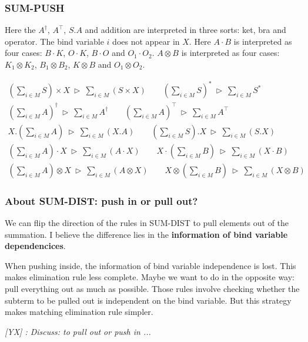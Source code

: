 \documentclass[manuscript, review, timestamp]{acmart}
\newcommand{\yx}[1]{\textit{\color{blue}[YX] : #1}}
\newcommand*{\reduce}{\ \triangleright\ }
\begin{document}
\subsubsection*{\textsf{SUM-PUSH}}

Here the $A^\dagger$, $A^\top$, $S.A$ and addition are interpreted in three sorts: ket, bra and operator.
The bind variable $i$ does not appear in $X$.
Here $A \cdot B$ is interpreted as four cases: $B \cdot K$, $O \cdot K$, $B \cdot O$ and $O_1 \cdot O_2$. $A \otimes B$ is interpreted as four cases: $K_1 \otimes K_2$, $B_1 \otimes B_2$, $K \otimes B$ and $O_1 \otimes O_2$.

\begin{gather*}
  (\sum_{i \in M} S) \times X \reduce \sum_{i \in M} (S \times X)
  \qquad
  (\sum_{i \in M} S)^* \reduce \sum_{i \in M} S^* \\
  (\sum_{i \in M} A)^\dagger \reduce \sum_{i \in M} A^\dagger
  \qquad
  (\sum_{i \in M} A)^\top \reduce \sum_{i \in M} A^\top \\
  X.(\sum_{i \in M} A) \reduce \sum_{i \in M} (X.A)
  \qquad
  (\sum_{i \in M} S). X \reduce \sum_{i \in M} (S.X) \\
  (\sum_{i \in M} A) \cdot X \reduce \sum_{i \in M} (A \cdot X) 
  \qquad
  X \cdot (\sum_{i \in M} B) \reduce \sum_{i \in M} (X \cdot B) \\
  (\sum_{i \in M} A) \otimes X \reduce \sum_{i \in M} (A \otimes X) 
  \qquad
  X \otimes (\sum_{i \in M} B) \reduce \sum_{i \in M} (X \otimes B)
\end{gather*}

\subsubsection*{About \textsf{SUM-DIST}: push in or pull out?}
We can flip the direction of the rules in \textsf{SUM-DIST} to pull elements out of the summation. I believe the difference lies in the \textbf{information of bind variable dependencices}.

When pushing inside, the information of bind variable independence is lost. This makes elimination rule less complete. Maybe we want to do in the opposite way: pull everything out as much as possible. Those rules involve checking whether the subterm to be pulled out is independent on the bind variable. But this strategy makes matching elimination rule simpler.

\yx{Discuss: to pull out or push in ...}

\end{document}
